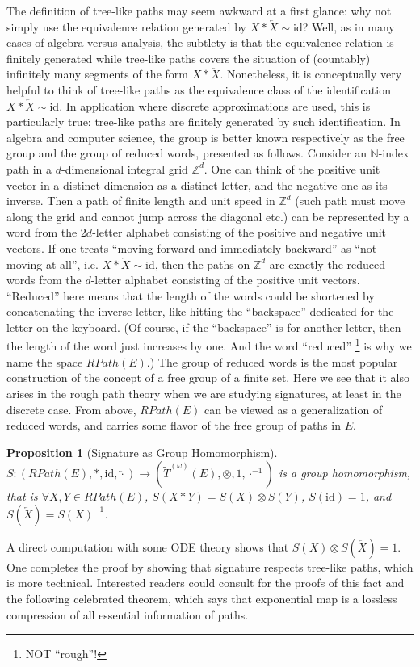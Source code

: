\documentclass[fleqn]{article}
\newtheorem{prop}[thm]{Proposition}
\theoremstyle{definition}
\theoremstyle{remark}
\newcommand{\id}{\mathrm{id}} %
\begin{document}
The definition of tree-like paths may seem awkward at a first glance: why not simply use the equivalence relation generated by $X*\overleftarrow{X} \sim \id$? Well, as in many cases of algebra versus analysis, the subtlety is that the equivalence relation is finitely generated while tree-like paths covers the situation of (countably) infinitely many segments of the form $X*\overleftarrow{X}$. Nonetheless, it is conceptually very helpful to think of tree-like paths as the equivalence class of the identification $X*\overleftarrow{X} \sim \id$. In application where discrete approximations are used, this is particularly true: tree-like paths are finitely generated by such identification. In algebra and computer science, the group is better known respectively as the free group and the group of reduced words, presented as follows. Consider an $\mathbb{N}$-index path in a $d$-dimensional integral grid $\mathbb{Z}^d$. One can think of the positive unit vector in a distinct dimension as a distinct letter, and the negative one as its inverse. Then a path of finite length and unit speed in $\mathbb{Z}^d$ (such path must move along the grid and cannot jump across the diagonal etc.) can be represented by a word from the $2d$-letter alphabet consisting of the positive and negative unit vectors. If one treats ``moving forward and immediately backward'' as ``not moving at all'', i.e. $X*\overleftarrow{X} \sim \id$, then the paths on $\mathbb{Z}^d$ are exactly the reduced words from the $d$-letter alphabet consisting of the positive unit vectors. ``Reduced'' here means that the length of the words could be shortened by concatenating the inverse letter, like hitting the ``backspace'' dedicated for the letter on the keyboard. (Of course, if the ``backspace'' is for another letter, then the length of the word just increases by one. And the word ``reduced'' \footnote{NOT ``rough''!} is why we name the space $RPath(E)$.) The group of reduced words is the most popular construction of the concept of a free group of a finite set. Here we see that it also arises in the rough path theory when we are studying signatures, at least in the discrete case. From above, $RPath(E)$ can be viewed as a generalization of reduced words, and carries some flavor of the free group of paths in $E$.

\begin{prop}[Signature as Group Homomorphism]
$S:\left(RPath(E),*,\id,\overleftarrow{\cdot}\right) \to \left(\tilde{T}^{(\omega)}(E),\otimes,1,\cdot^{-1}\right)$ is a group homomorphism, that is $\forall X,Y\in RPath(E)$, $S(X*Y)=S(X)\otimes S(Y)$, $S(\id)=1$, and $S\left(\overleftarrow{X}\right)=S(X)^{-1}$.
\end{prop}
A direct computation with some ODE theory shows that $S(X)\otimes S\left(\overleftarrow{X}\right) = 1$. One completes the proof by showing that signature respects tree-like paths, which is more technical. Interested readers could consult \citet{Hambly2005} for the proofs of this fact and the following celebrated theorem, which says that exponential map is a lossless compression of all essential information of paths.
\end{document}

